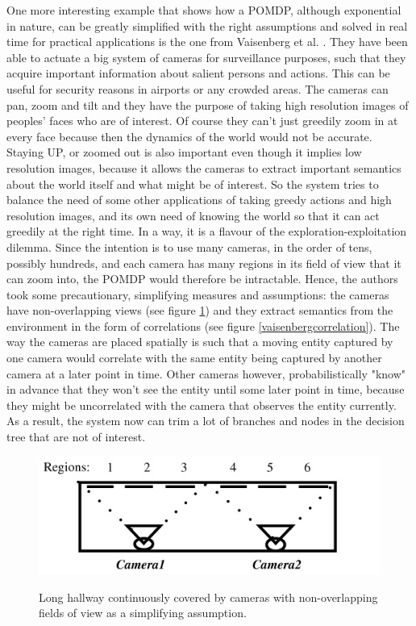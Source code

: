 \documentclass[a4paper,11pt,english]{article}
\begin{document}
One more interesting example that shows how a POMDP, although exponential in nature, can be greatly simplified with the right assumptions and solved in real time for practical applications is the one from Vaisenberg et al. \cite{vaisenberg2014scheduling}. They have been able to actuate a big system of cameras for surveillance purposes, such that they acquire important information about salient persons and actions. This can be useful for security reasons in airports or any crowded areas. The cameras can pan, zoom and tilt and they have the purpose of taking high resolution images of peoples' faces who are of interest. Of course they can't just greedily zoom in at every face because then the dynamics of the world would not be accurate. Staying UP, or zoomed out is also important even though it implies low resolution images, because it allows the cameras to extract important semantics about the world itself and what might be of interest. So the system tries to balance the need of some other applications of taking greedy actions and high resolution images, and its own need of knowing the world so that it can act greedily at the right time. In a way, it is a flavour of the exploration-exploitation dilemma. Since the intention is to use many cameras, in the order of tens, possibly hundreds, and each camera has many regions in its field of view that it can zoom into, the POMDP would therefore be intractable. Hence, the authors took some precautionary, simplifying measures and assumptions: the cameras have non-overlapping views (see figure \ref{vaisenbergcameras}) and they extract semantics from the environment in the form of correlations (see figure \ref{vaisenbergcorrelation}). The way the cameras are placed spatially is such that a moving entity captured by one camera would correlate with the same entity being captured by another camera at a later point in time. Other cameras however, probabilistically "know" in advance that they won't see the entity until some later point in time, because they might be uncorrelated with the camera that observes the entity currently. As a result, the system now can trim a lot of branches and nodes in the decision tree that are not of interest.

\begin{figure}[H]
  \caption{
  Long hallway continuously covered by cameras with non-overlapping fields of view as a simplifying assumption.}
  \centering
    \includegraphics[scale=0.5]{vaisenbergmethod1.png}
  \label{vaisenbergcameras}
\end{figure}
\end{document}
